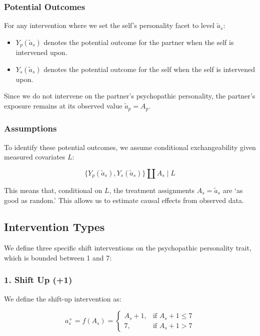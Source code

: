 \documentclass[
  single column]{article}
\providecommand{\tightlist}{%
  \setlength{\itemsep}{0pt}\setlength{\parskip}{0pt}}\usepackage{longtable,booktabs,array}
\begin{document}
\subsubsection{Potential Outcomes}\label{potential-outcomes}

For any intervention where we set the self's personality facet to level
\(\tilde{a}_s\):

\begin{itemize}
\tightlist
\item
  \(Y_p(\tilde{a}_s)\) denotes the potential outcome for the partner
  when the self is intervened upon.
\item
  \(Y_s(\tilde{a}_s)\) denotes the potential outcome for the self when
  the self is intervened upon.
\end{itemize}

Since we do not intervene on the partner's psychopathic personality, the
partner's exposure remains at its observed value \(\tilde{a}_p = A_p\).

\subsubsection{Assumptions}\label{assumptions}

To identify these potential outcomes, we assume conditional
exchangeability given measured covariates \(L\):

\[
\Big\{ Y_p(\tilde{a}_s), Y_s(\tilde{a}_s) \Big\} \coprod A_s \mid L
\]

This means that, conditional on \(L\), the treatment assignments
\(A_s = \tilde{a}_s\) are `as good as random.' This allows us to
estimate causal effects from observed data.

\subsection{Intervention Types}\label{intervention-types}

We define three specific shift interventions on the psychopathic
personality trait, which is bounded between 1 and 7:

\subsubsection{1. Shift Up (+1)}\label{shift-up-1}

We define the shift-up intervention as:

\[
a_s^+ = f(A_s) = 
\begin{cases}
A_s + 1, & \text{if } A_s + 1 \leq 7 \\
7, & \text{if } A_s + 1 > 7
\end{cases}
\]
\end{document}
